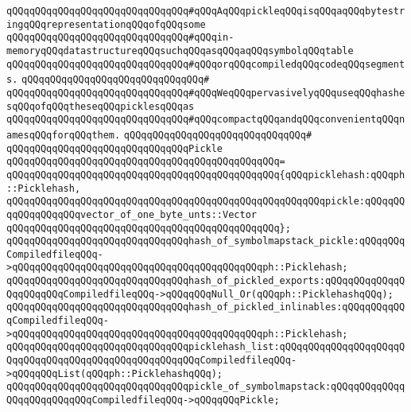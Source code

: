 \newline
\newline
\verb|qQQqqQQqqQQqqQQqqQQqqQQqqQQqqQQq#qQQqAqQQqpickleqQQqisqQQqaqQQqbytestringqQQqrepresentationqQQqofqQQqsome|\newline
\verb|qQQqqQQqqQQqqQQqqQQqqQQqqQQqqQQq#qQQqin-memoryqQQqdatastructureqQQqsuchqQQqasqQQqaqQQqsymbolqQQqtable|\newline
\verb|qQQqqQQqqQQqqQQqqQQqqQQqqQQqqQQq#qQQqorqQQqcompiledqQQqcodeqQQqsegments.|\newline
\verb|qQQqqQQqqQQqqQQqqQQqqQQqqQQqqQQq#|\newline
\verb|qQQqqQQqqQQqqQQqqQQqqQQqqQQqqQQq#qQQqWeqQQqpervasivelyqQQquseqQQqhashesqQQqofqQQqtheseqQQqpicklesqQQqas|\newline
\verb|qQQqqQQqqQQqqQQqqQQqqQQqqQQqqQQq#qQQqcompactqQQqandqQQqconvenientqQQqnamesqQQqforqQQqthem.|\newline
\verb|qQQqqQQqqQQqqQQqqQQqqQQqqQQqqQQq#|\newline
\verb|qQQqqQQqqQQqqQQqqQQqqQQqqQQqqQQqPickle|\newline
\verb|qQQqqQQqqQQqqQQqqQQqqQQqqQQqqQQqqQQqqQQqqQQqqQQq=|\newline
\verb|qQQqqQQqqQQqqQQqqQQqqQQqqQQqqQQqqQQqqQQqqQQqqQQq{qQQqpicklehash:qQQqph::Picklehash,|\newline
\verb|qQQqqQQqqQQqqQQqqQQqqQQqqQQqqQQqqQQqqQQqqQQqqQQqqQQqqQQqpickle:qQQqqQQqqQQqqQQqqQQqvector_of_one_byte_unts::Vector|\newline
\verb|qQQqqQQqqQQqqQQqqQQqqQQqqQQqqQQqqQQqqQQqqQQqqQQq};|\newline
\newline
\verb|qQQqqQQqqQQqqQQqqQQqqQQqqQQqqQQqhash_of_symbolmapstack_pickle:qQQqqQQqCompiledfileqQQq->qQQqqQQqqQQqqQQqqQQqqQQqqQQqqQQqqQQqqQQqqQQqph::Picklehash;|\newline
\verb|qQQqqQQqqQQqqQQqqQQqqQQqqQQqqQQqhash_of_pickled_exports:qQQqqQQqqQQqqQQqqQQqqQQqCompiledfileqQQq->qQQqqQQqNull_Or(qQQqph::PicklehashqQQq);|\newline
\verb|qQQqqQQqqQQqqQQqqQQqqQQqqQQqqQQqhash_of_pickled_inlinables:qQQqqQQqqQQqCompiledfileqQQq->qQQqqQQqqQQqqQQqqQQqqQQqqQQqqQQqqQQqqQQqqQQqph::Picklehash;|\newline
\newline
\verb|qQQqqQQqqQQqqQQqqQQqqQQqqQQqqQQqpicklehash_list:qQQqqQQqqQQqqQQqqQQqqQQqqQQqqQQqqQQqqQQqqQQqqQQqqQQqqQQqCompiledfileqQQq->qQQqqQQqList(qQQqph::PicklehashqQQq);|\newline
\verb|qQQqqQQqqQQqqQQqqQQqqQQqqQQqqQQqpickle_of_symbolmapstack:qQQqqQQqqQQqqQQqqQQqqQQqqQQqCompiledfileqQQq->qQQqqQQqPickle;|\newline
